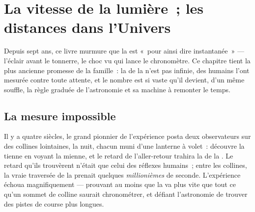\chapter{La vitesse de la lumière~; les distances dans l'Univers}\label{ch:g8:speed-of-light}

Depuis sept ans, ce livre murmure que la  est «~pour ainsi dire
instantanée~» --- l'éclair avant le tonnerre, le choc vu qui lance le
chronomètre. Ce chapitre tient la plus ancienne promesse de la
famille~: la  de la  n'est pas infinie, des humains l'ont
mesurée contre toute attente, et le nombre est si vaste qu'il devient,
d'un même souffle, la règle graduée de l'astronomie et sa machine à
remonter le temps.

\section{La mesure impossible}

\begin{example}\label{ex:g8:speed-of-light:galileo}
Il y a quatre siècles, le grand pionnier de l'expérience posta deux
observateurs sur des collines lointaines, la nuit, chacun muni d'une
lanterne à volet~: découvre la tienne en voyant la mienne, et le
retard de l'aller-retour trahira la  de la . Le retard
qu'ils trouvèrent n'était que celui des réflexes humains~; entre les
collines, la vraie traversée de la  prenait quelques
\emph{millionièmes} de seconde. L'expérience échoua magnifiquement ---
prouvant au moins que la  va plus vite que tout ce qu'un sommet
de colline saurait chronométrer, et défiant l'astronomie de trouver
des pistes de course plus longues.
\end{example}

